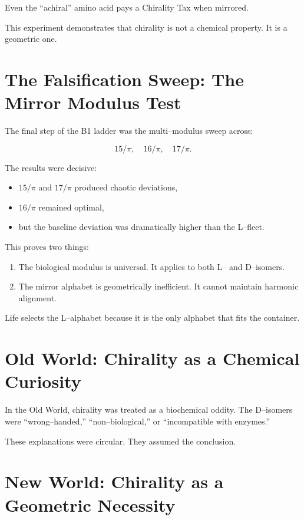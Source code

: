 \documentclass[11pt, letterpaper, openany]{book}
\begin{document}
Even the “achiral” amino acid pays a Chirality Tax when mirrored.

This experiment demonstrates that chirality is not a chemical property.  
It is a geometric one.

\section{The Falsification Sweep: The Mirror Modulus Test}

The final step of the B1 ladder was the multi–modulus sweep across:



\[
15/\pi,\quad 16/\pi,\quad 17/\pi.
\]



The results were decisive:

\begin{itemize}
    \item $15/\pi$ and $17/\pi$ produced chaotic deviations,
    \item $16/\pi$ remained optimal,
    \item but the baseline deviation was dramatically higher than the L–fleet.
\end{itemize}

This proves two things:

\begin{enumerate}
    \item The biological modulus is universal.  
          It applies to both L– and D–isomers.

    \item The mirror alphabet is geometrically inefficient.  
          It cannot maintain harmonic alignment.
\end{enumerate}

Life selects the L–alphabet because it is the only alphabet that fits the
container.

\section{Old World: Chirality as a Chemical Curiosity}

In the Old World, chirality was treated as a biochemical oddity.  
The D–isomers were “wrong–handed,” “non–biological,” or “incompatible with
enzymes.”

These explanations were circular.  
They assumed the conclusion.

\section{New World: Chirality as a Geometric Necessity}
\end{document}
